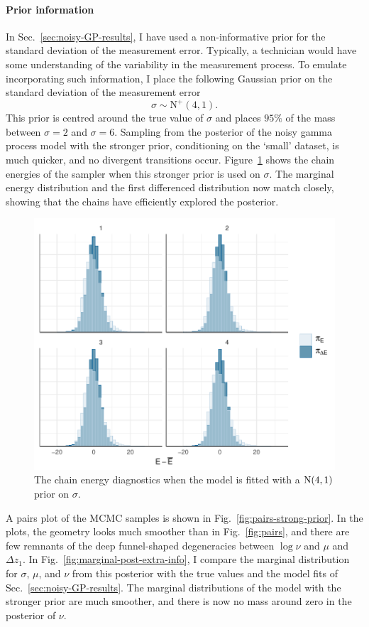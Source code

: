 \paragraph*{Prior information}

In Sec.~\ref{sec:noisy-GP-results}, I have used a non-informative prior for the standard deviation of the measurement error. Typically, a technician would have some understanding of the variability in the measurement process. To emulate incorporating such information, I place the following Gaussian prior on the standard deviation of the measurement error
\begin{equation*}
  \sigma \sim \mbox{N}^{+}(4, 1).
\end{equation*}
This prior is centred around the true value of $\sigma$ and places $95\%$ of the mass between $\sigma = 2$ and $\sigma = 6$. Sampling from the posterior of the noisy gamma process model with the stronger prior, conditioning on the `small' dataset, is much quicker, and no divergent transitions occur. Figure~\ref{fig:energies-strong-prior} shows the chain energies of the sampler when this stronger prior is used on $\sigma$. The marginal energy distribution and the first differenced distribution now match closely, showing that the chains have efficiently explored the posterior.

\begin{figure}
  \centering
  \includegraphics[width=0.8\columnwidth]{./figures/ch-4/strong-prior-nuts-energy.pdf}
  \caption{The chain energy diagnostics when the model is fitted with a $\hbox{N}(4, 1)$ prior on $\sigma$.}
  \label{fig:energies-strong-prior}
\end{figure}

A pairs plot of the MCMC samples is shown in Fig.~\ref{fig:pairs-strong-prior}. In the plots, the geometry looks much smoother than in Fig.~\ref{fig:pairs}, and there are few remnants of the deep funnel-shaped degeneracies between $\log{\nu}$ and $\mu$ and $\Delta z_1$. In Fig.~\ref{fig:marginal-post-extra-info}, I compare the marginal distribution for $\sigma$, $\mu$, and $\nu$ from this posterior with the true values and the model fits of Sec.~\ref{sec:noisy-GP-results}. The marginal distributions of the model with the stronger prior are much smoother, and there is now no mass around zero in the posterior of $\nu$.

